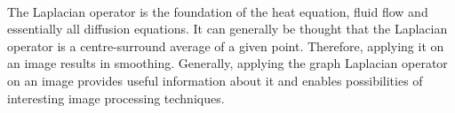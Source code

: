 %
%
%

\paragraph{}
The Laplacian operator is the foundation of the heat equation, fluid flow and essentially all diffusion equations.
It can generally be thought that the Laplacian operator is a centre-surround average \cite{siam_slides_2016} of a given point.
Therefore, applying it on an image results in smoothing.
Generally, applying the graph Laplacian operator on an image provides useful information about it and enables possibilities of interesting image processing techniques.
